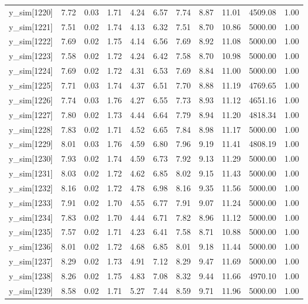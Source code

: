 \begin{table}[ht]
\begin{tabular}{rrrrrrrrrrr}
  y\_sim[1220] & 7.72 & 0.03 & 1.71 & 4.24 & 6.57 & 7.74 & 8.87 & 11.01 & 4509.08 & 1.00 \\ 
  y\_sim[1221] & 7.51 & 0.02 & 1.74 & 4.13 & 6.32 & 7.51 & 8.70 & 10.86 & 5000.00 & 1.00 \\ 
  y\_sim[1222] & 7.69 & 0.02 & 1.75 & 4.14 & 6.56 & 7.69 & 8.92 & 11.08 & 5000.00 & 1.00 \\ 
  y\_sim[1223] & 7.58 & 0.02 & 1.72 & 4.24 & 6.42 & 7.58 & 8.70 & 10.98 & 5000.00 & 1.00 \\ 
  y\_sim[1224] & 7.69 & 0.02 & 1.72 & 4.31 & 6.53 & 7.69 & 8.84 & 11.00 & 5000.00 & 1.00 \\ 
  y\_sim[1225] & 7.71 & 0.03 & 1.74 & 4.37 & 6.51 & 7.70 & 8.88 & 11.19 & 4769.65 & 1.00 \\ 
  y\_sim[1226] & 7.74 & 0.03 & 1.76 & 4.27 & 6.55 & 7.73 & 8.93 & 11.12 & 4651.16 & 1.00 \\ 
  y\_sim[1227] & 7.80 & 0.02 & 1.73 & 4.44 & 6.64 & 7.79 & 8.94 & 11.20 & 4818.34 & 1.00 \\ 
  y\_sim[1228] & 7.83 & 0.02 & 1.71 & 4.52 & 6.65 & 7.84 & 8.98 & 11.17 & 5000.00 & 1.00 \\ 
  y\_sim[1229] & 8.01 & 0.03 & 1.76 & 4.59 & 6.80 & 7.96 & 9.19 & 11.41 & 4808.19 & 1.00 \\ 
  y\_sim[1230] & 7.93 & 0.02 & 1.74 & 4.59 & 6.73 & 7.92 & 9.13 & 11.29 & 5000.00 & 1.00 \\ 
  y\_sim[1231] & 8.03 & 0.02 & 1.72 & 4.62 & 6.85 & 8.02 & 9.15 & 11.43 & 5000.00 & 1.00 \\ 
  y\_sim[1232] & 8.16 & 0.02 & 1.72 & 4.78 & 6.98 & 8.16 & 9.35 & 11.56 & 5000.00 & 1.00 \\ 
  y\_sim[1233] & 7.91 & 0.02 & 1.70 & 4.55 & 6.77 & 7.91 & 9.07 & 11.24 & 5000.00 & 1.00 \\ 
  y\_sim[1234] & 7.83 & 0.02 & 1.70 & 4.44 & 6.71 & 7.82 & 8.96 & 11.12 & 5000.00 & 1.00 \\ 
  y\_sim[1235] & 7.57 & 0.02 & 1.71 & 4.23 & 6.41 & 7.58 & 8.71 & 10.88 & 5000.00 & 1.00 \\ 
  y\_sim[1236] & 8.01 & 0.02 & 1.72 & 4.68 & 6.85 & 8.01 & 9.18 & 11.44 & 5000.00 & 1.00 \\ 
  y\_sim[1237] & 8.29 & 0.02 & 1.73 & 4.91 & 7.12 & 8.29 & 9.47 & 11.69 & 5000.00 & 1.00 \\ 
  y\_sim[1238] & 8.26 & 0.02 & 1.75 & 4.83 & 7.08 & 8.32 & 9.44 & 11.66 & 4970.10 & 1.00 \\ 
  y\_sim[1239] & 8.58 & 0.02 & 1.71 & 5.27 & 7.44 & 8.59 & 9.71 & 11.96 & 5000.00 & 1.00 \\ 

\end{tabular}
\end{table}
